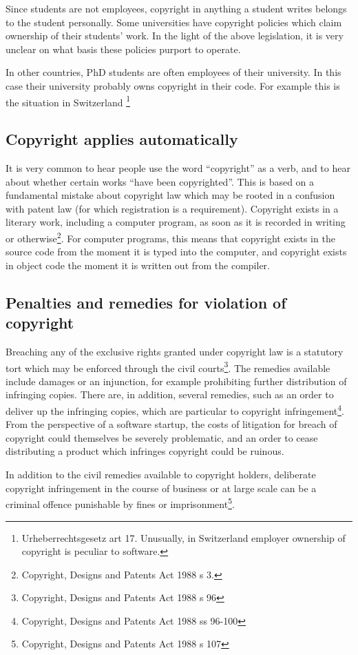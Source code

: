 \documentclass[a4paper,12pt]{article}
\newcommand{\CDPA}[1][]{Copyright, Designs and Patents Act 1988 #1\xspace}
\newcommand{\URG}[1][]{Urheberrechtsgesetz #1\xspace}
\begin{document}
Since students are not employees, copyright in anything a student writes
belongs to the student personally. Some universities have copyright policies
which claim ownership of their students' work. In the light of the above
legislation, it is very unclear on what basis these policies purport to operate.

In other countries, PhD students are often employees of their university. In
this case their university probably owns copyright in their code. For
example this is the situation in Switzerland \footnote{\URG[art
  17]. Unusually, in Switzerland employer ownership of copyright is peculiar to software.} 

\subsection{Copyright applies automatically}

It is very common to hear people use the word ``copyright'' as a verb, and
to hear about whether certain works ``have been copyrighted''. This is based
on a fundamental mistake about copyright law which may be rooted in a
confusion with patent law (for which registration is a
requirement). Copyright exists in a literary work, including a computer
program, as soon as it is recorded in writing or otherwise\footnote{\CDPA[s
  3.]}. For computer programs, this means that copyright exists in the
source code from the moment it is typed into the computer, and copyright
exists in object code the moment it is written out from the compiler. 

\subsection{Penalties and remedies for violation of copyright}

Breaching any of the exclusive rights granted under copyright law is a
statutory tort which may be enforced through the civil
courts\footnote{\CDPA[s 96]}. The remedies available include damages or an
injunction, for example prohibiting further distribution of infringing
copies. There are, in addition, several remedies, such as an order to
deliver up the infringing copies, which are particular to copyright
infringement\footnote{\CDPA[ss 96-100]}. From the perspective of a software
startup, the costs of litigation for breach of copyright could themselves be
severely problematic, and an order to cease distributing a product which
infringes copyright could be ruinous.

In addition to the civil remedies available to copyright holders, deliberate
copyright infringement in the course of business or at large scale can be a
criminal offence punishable by fines or imprisonment\footnote{\CDPA[s 107]}.
\end{document}
